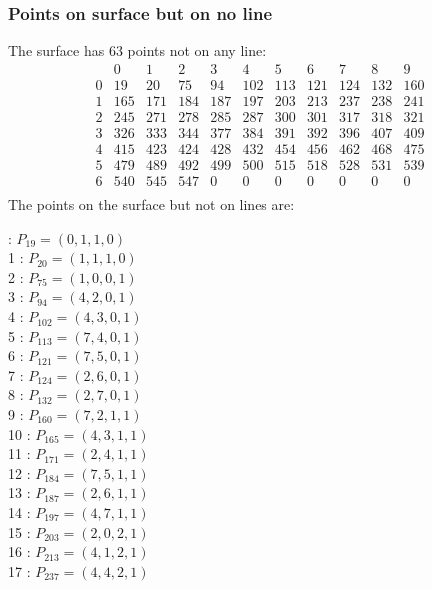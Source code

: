 \documentclass{article}
\begin{document}
{\subsubsection*{Points on surface but on no line}
The surface has 63 points not on any line:\\
$$
\begin{array}{r|*{10}{r}}
 & 0 & 1 & 2 & 3 & 4 & 5 & 6 & 7 & 8 & 9\\
\hline
0 & 19 & 20 & 75 & 94 & 102 & 113 & 121 & 124 & 132 & 160\\
1 & 165 & 171 & 184 & 187 & 197 & 203 & 213 & 237 & 238 & 241\\
2 & 245 & 271 & 278 & 285 & 287 & 300 & 301 & 317 & 318 & 321\\
3 & 326 & 333 & 344 & 377 & 384 & 391 & 392 & 396 & 407 & 409\\
4 & 415 & 423 & 424 & 428 & 432 & 454 & 456 & 462 & 468 & 475\\
5 & 479 & 489 & 492 & 499 & 500 & 515 & 518 & 528 & 531 & 539\\
6 & 540 & 545 & 547 & 0 & 0 & 0 & 0 & 0 & 0 & 0\\
\end{array}
$$
The points on the surface but not on lines are:\\
\begin{multicols}{2}
 : $P_{19}=( 0, 1, 1, 0 )$\\
1 : $P_{20}=( 1, 1, 1, 0 )$\\
2 : $P_{75}=( 1, 0, 0, 1 )$\\
3 : $P_{94}=( 4, 2, 0, 1 )$\\
4 : $P_{102}=( 4, 3, 0, 1 )$\\
5 : $P_{113}=( 7, 4, 0, 1 )$\\
6 : $P_{121}=( 7, 5, 0, 1 )$\\
7 : $P_{124}=( 2, 6, 0, 1 )$\\
8 : $P_{132}=( 2, 7, 0, 1 )$\\
9 : $P_{160}=( 7, 2, 1, 1 )$\\
10 : $P_{165}=( 4, 3, 1, 1 )$\\
11 : $P_{171}=( 2, 4, 1, 1 )$\\
12 : $P_{184}=( 7, 5, 1, 1 )$\\
13 : $P_{187}=( 2, 6, 1, 1 )$\\
14 : $P_{197}=( 4, 7, 1, 1 )$\\
15 : $P_{203}=( 2, 0, 2, 1 )$\\
16 : $P_{213}=( 4, 1, 2, 1 )$\\
17 : $P_{237}=( 4, 4, 2, 1 )$\\

\end{multicols}}
\end{document}
